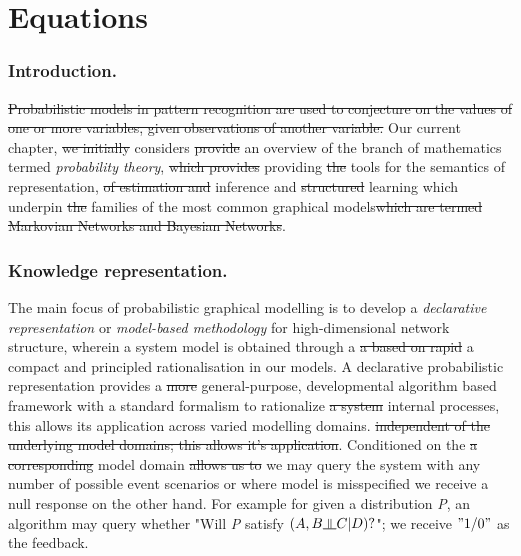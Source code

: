 \documentclass[7pt]{article}
\newcommand{\inperp}{\rotatebox[origin=c]{90}{$\models$}}
\begin{document}
	
\tableofcontents
\newpage
\part{Equations}

\section{Introduction.}
\st{Probabilistic models in pattern recognition are used to conjecture on the values of one or more variables, given observations of  another variable.}
Our current chapter, \st{we initially} considers \st{provide} an overview of the branch of mathematics termed \emph{probability theory}, \st{which provides} providing \st{the} tools for the semantics of representation, \st{of estimation and} inference and \st{structured} learning which underpin \st{the} families of the most common graphical models\st{which are termed Markovian Networks and Bayesian Networks}. 
\\

\section{Knowledge representation.}
The main focus of {probabilistic graphical modelling} is to develop a \emph{declarative representation} or \emph{model-based methodology} for high-dimensional network structure, wherein a system model is obtained through a \st{a based on rapid} a compact and principled rationalisation in our models. A {declarative probabilistic representation} provides  a \st{more} general-purpose, developmental algorithm based framework with a standard formalism to rationalize \st{a system} internal processes, this allows its application across varied modelling domains.  \st{independent of the underlying model domains; this allows it's application}. Conditioned on the \st{a corresponding} model domain \st{allows us to} we may query the system with any number of possible event scenarios or where model is misspecified we receive a null response on the other hand. For example for given a distribution \emph{P}, an algorithm may query whether "Will \emph{P} satisfy $(A,B \inperp  C | D)?$"; we receive $"1/0"$ as the feedback. 
\end{document}
